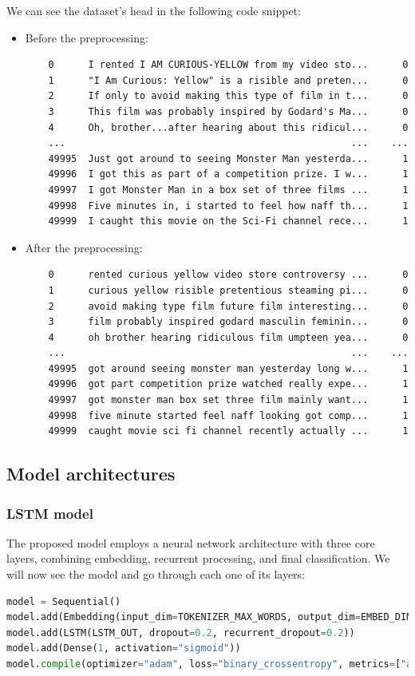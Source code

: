 \documentclass{article}
\begin{document}
We can see the dataset's head in the following code snippet:
\begin{itemize}
  \item Before the preprocessing:
    \begin{lstlisting}
    0      I rented I AM CURIOUS-YELLOW from my video sto...      0
    1      "I Am Curious: Yellow" is a risible and preten...      0
    2      If only to avoid making this type of film in t...      0
    3      This film was probably inspired by Godard's Ma...      0
    4      Oh, brother...after hearing about this ridicul...      0
    ...                                                  ...    ...
    49995  Just got around to seeing Monster Man yesterda...      1
    49996  I got this as part of a competition prize. I w...      1
    49997  I got Monster Man in a box set of three films ...      1
    49998  Five minutes in, i started to feel how naff th...      1
    49999  I caught this movie on the Sci-Fi channel rece...      1
    \end{lstlisting}

  \item After the preprocessing:
    \begin{lstlisting}
    0      rented curious yellow video store controversy ...      0
    1      curious yellow risible pretentious steaming pi...      0
    2      avoid making type film future film interesting...      0
    3      film probably inspired godard masculin feminin...      0
    4      oh brother hearing ridiculous film umpteen yea...      0
    ...                                                  ...    ...
    49995  got around seeing monster man yesterday long w...      1
    49996  got part competition prize watched really expe...      1
    49997  got monster man box set three film mainly want...      1
    49998  five minute started feel naff looking got comp...      1
    49999  caught movie sci fi channel recently actually ...      1
    \end{lstlisting}
\end{itemize}

\subsection{Model architectures}

\subsubsection{LSTM model}
The proposed model employs a neural network architecture with three core layers, combining embedding, recurrent processing, and final classification.
We will now see the model and go through each one of its layers:
\begin{lstlisting}[language=python]
model = Sequential()
model.add(Embedding(input_dim=TOKENIZER_MAX_WORDS, output_dim=EMBED_DIM))
model.add(LSTM(LSTM_OUT, dropout=0.2, recurrent_dropout=0.2))
model.add(Dense(1, activation="sigmoid"))
model.compile(optimizer="adam", loss="binary_crossentropy", metrics=["accuracy"])
\end{lstlisting}
\end{document}

